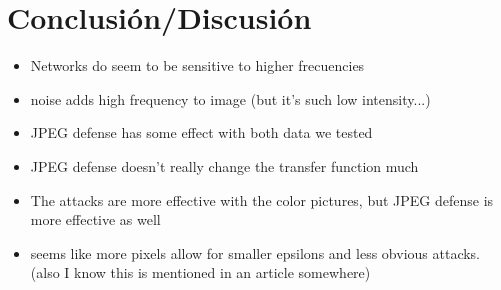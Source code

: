 \section{Conclusión/Discusión}
\begin{itemize}
    \item Networks do seem to be sensitive to higher frecuencies
    \item noise adds high frequency to image (but it's such low intensity...)
    \item JPEG defense has some effect with both data we tested
    \item JPEG defense doesn't really change the transfer function much
    \item The attacks are more effective with the color pictures, but JPEG defense is more effective as well
    \item seems like more pixels allow for smaller epsilons and less obvious attacks. (also I know this is mentioned in an article somewhere)
\end{itemize}